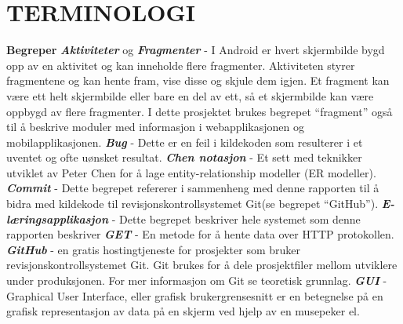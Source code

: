 \documentclass[../main.tex]{subfiles}
\begin{document}
\section*{TERMINOLOGI}

{\bfseries \large Begreper}\newline
\newline
\textbf{\textit{Aktiviteter}} og \textbf{\textit{Fragmenter}} - I Android er hvert skjermbilde bygd opp av en aktivitet og kan inneholde flere fragmenter. Aktiviteten styrer fragmentene og kan hente fram, vise disse og skjule dem igjen. Et fragment kan være ett helt skjermbilde eller bare en del av ett, så et skjermbilde kan være oppbygd av flere fragmenter.  I dette prosjektet brukes begrepet “fragment” også til å beskrive moduler med informasjon i webapplikasjonen og mobilapplikasjonen. \newline
\newline
\textbf{\textit{Bug}} - Dette er en feil i kildekoden som resulterer i et uventet og ofte uønsket resultat.\newline
\newline
\textbf{\textit{Chen notasjon}} - Et sett med teknikker utviklet av Peter Chen for å lage entity-relationship modeller (ER modeller). \newline
\newline
\textbf{\textit{Commit}} - Dette begrepet refererer i sammenheng med denne rapporten til å bidra med kildekode til revisjonskontrollsystemet Git(se begrepet “GitHub”).\newline
\newline
\textbf{\textit{E-læringsapplikasjon}} - Dette begrepet beskriver hele systemet som denne rapporten beskriver\newline
\newline
\textbf{\textit{GET}} - En metode for å hente data over HTTP protokollen.  \newline
\newline
\textbf{\textit{GitHub}} - en gratis hostingtjeneste for prosjekter som bruker revisjonskontrollsystemet Git. Git brukes for å dele prosjektfiler mellom utviklere under produksjonen. For mer informasjon om Git se teoretisk grunnlag.\newline
\newline
\textbf{\textit{GUI}} - Graphical User Interface, eller grafisk brukergrensesnitt er en betegnelse på en grafisk representasjon av data på en skjerm ved hjelp av en musepeker el.\newline
\newline
\end{document}
